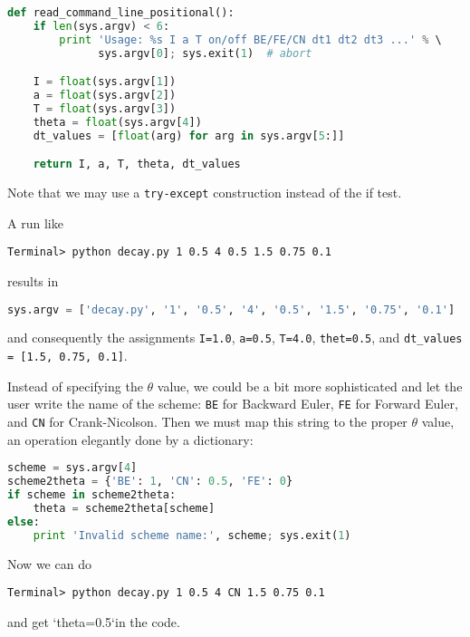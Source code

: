 \documentclass[graybox,sectrefs,envcountresetchap,open=right,final]{svmonodo}
\begin{document}
\begin{lstlisting}[language=Python,style=blue1_bluegreen]
def read_command_line_positional():
    if len(sys.argv) < 6:
        print 'Usage: %s I a T on/off BE/FE/CN dt1 dt2 dt3 ...' % \ 
              sys.argv[0]; sys.exit(1)  # abort

    I = float(sys.argv[1])
    a = float(sys.argv[2])
    T = float(sys.argv[3])
    theta = float(sys.argv[4])
    dt_values = [float(arg) for arg in sys.argv[5:]]

    return I, a, T, theta, dt_values
\end{lstlisting}
Note that we may use a \texttt{try-except} construction instead of the if test.

A run like

\begin{Verbatim}[frame=lines,label=\fbox{{\tiny Terminal}},framesep=2.5mm,framerule=0.7pt,fontsize=\fontsize{9pt}{9pt}]
Terminal> python decay.py 1 0.5 4 0.5 1.5 0.75 0.1
\end{Verbatim}
results in

\begin{lstlisting}[language=Python,style=blue1_bluegreen]
sys.argv = ['decay.py', '1', '0.5', '4', '0.5', '1.5', '0.75', '0.1']
\end{lstlisting}
and consequently the assignments \texttt{I=1.0}, \texttt{a=0.5}, \texttt{T=4.0}, \texttt{thet=0.5},
and \Verb!dt_values = [1.5, 0.75, 0.1]!.

Instead of specifying the $\theta$ value, we could be a bit more
sophisticated and let the user write the name of the scheme:
\texttt{BE} for Backward Euler, \texttt{FE} for Forward Euler, and \texttt{CN}
for Crank-Nicolson. Then we must map this string to the proper
$\theta$ value, an operation elegantly done by a dictionary:

\begin{lstlisting}[language=Python,style=blue1_bluegreen]
scheme = sys.argv[4]
scheme2theta = {'BE': 1, 'CN': 0.5, 'FE': 0}
if scheme in scheme2theta:
    theta = scheme2theta[scheme]
else:
    print 'Invalid scheme name:', scheme; sys.exit(1)
\end{lstlisting}
Now we can do

\begin{Verbatim}[frame=lines,label=\fbox{{\tiny Terminal}},framesep=2.5mm,framerule=0.7pt,fontsize=\fontsize{9pt}{9pt}]
Terminal> python decay.py 1 0.5 4 CN 1.5 0.75 0.1
\end{Verbatim}
and get `theta=0.5`in the code.
\end{document}
